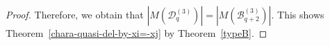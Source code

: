 \documentclass{article}
\theoremstyle{plain}
\theoremstyle{definition}
\theoremstyle{remark}
\numberwithin{equation}{section}
\newcommand{\Bc}{\mathcal{B}}
\newcommand{\Dc}{\mathcal{D}}
\begin{document}
\begin{proof}









Therefore, we obtain that $|M(\Dc_q^{(3)})| = |M(\Bc_{q+2}^{(3)})|$. 
This shows Theorem~\ref{chara-quasi-del-by-xi=-xj} by Theorem~\ref{typeB}. 
\end{proof}
\end{document}
